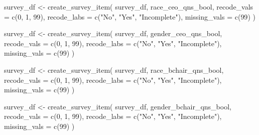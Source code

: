 \documentclass[
  letterpaper,
]{scrbook}
\newenvironment{Shaded}{\begin{snugshade}}{\end{snugshade}}
\newcommand{\AttributeTok}[1]{\textcolor[rgb]{0.40,0.45,0.13}{#1}}
\newcommand{\DecValTok}[1]{\textcolor[rgb]{0.68,0.00,0.00}{#1}}
\newcommand{\FunctionTok}[1]{\textcolor[rgb]{0.28,0.35,0.67}{#1}}
\newcommand{\NormalTok}[1]{\textcolor[rgb]{0.00,0.23,0.31}{#1}}
\newcommand{\OtherTok}[1]{\textcolor[rgb]{0.00,0.23,0.31}{#1}}
\newcommand{\StringTok}[1]{\textcolor[rgb]{0.13,0.47,0.30}{#1}}
\begin{document}
\begin{Shaded}
\begin{Highlighting}[]
\NormalTok{survey\_df }\OtherTok{\textless{}{-}} \FunctionTok{create\_survey\_item}\NormalTok{(}
\NormalTok{  survey\_df, }
\NormalTok{  race\_ceo\_qns\_bool, }
  \AttributeTok{recode\_vals =} \FunctionTok{c}\NormalTok{(}\DecValTok{0}\NormalTok{, }\DecValTok{1}\NormalTok{, }\DecValTok{99}\NormalTok{), }
  \AttributeTok{recode\_labs =} \FunctionTok{c}\NormalTok{(}\StringTok{"No"}\NormalTok{, }\StringTok{"Yes"}\NormalTok{, }\StringTok{"Incomplete"}\NormalTok{), }
  \AttributeTok{missing\_vals =} \FunctionTok{c}\NormalTok{(}\DecValTok{99}\NormalTok{)}
\NormalTok{)}

\NormalTok{survey\_df }\OtherTok{\textless{}{-}} \FunctionTok{create\_survey\_item}\NormalTok{(}
\NormalTok{  survey\_df, }
\NormalTok{  gender\_ceo\_qns\_bool, }
  \AttributeTok{recode\_vals =} \FunctionTok{c}\NormalTok{(}\DecValTok{0}\NormalTok{, }\DecValTok{1}\NormalTok{, }\DecValTok{99}\NormalTok{), }
  \AttributeTok{recode\_labs =} \FunctionTok{c}\NormalTok{(}\StringTok{"No"}\NormalTok{, }\StringTok{"Yes"}\NormalTok{, }\StringTok{"Incomplete"}\NormalTok{), }
  \AttributeTok{missing\_vals =} \FunctionTok{c}\NormalTok{(}\DecValTok{99}\NormalTok{)}
\NormalTok{)}

\NormalTok{survey\_df }\OtherTok{\textless{}{-}} \FunctionTok{create\_survey\_item}\NormalTok{(}
\NormalTok{  survey\_df, }
\NormalTok{  race\_bchair\_qns\_bool, }
  \AttributeTok{recode\_vals =} \FunctionTok{c}\NormalTok{(}\DecValTok{0}\NormalTok{, }\DecValTok{1}\NormalTok{, }\DecValTok{99}\NormalTok{), }
  \AttributeTok{recode\_labs =} \FunctionTok{c}\NormalTok{(}\StringTok{"No"}\NormalTok{, }\StringTok{"Yes"}\NormalTok{, }\StringTok{"Incomplete"}\NormalTok{), }
  \AttributeTok{missing\_vals =} \FunctionTok{c}\NormalTok{(}\DecValTok{99}\NormalTok{)}
\NormalTok{)}

\NormalTok{survey\_df }\OtherTok{\textless{}{-}} \FunctionTok{create\_survey\_item}\NormalTok{(}
\NormalTok{  survey\_df, }
\NormalTok{  gender\_bchair\_qns\_bool, }
  \AttributeTok{recode\_vals =} \FunctionTok{c}\NormalTok{(}\DecValTok{0}\NormalTok{, }\DecValTok{1}\NormalTok{, }\DecValTok{99}\NormalTok{), }
  \AttributeTok{recode\_labs =} \FunctionTok{c}\NormalTok{(}\StringTok{"No"}\NormalTok{, }\StringTok{"Yes"}\NormalTok{, }\StringTok{"Incomplete"}\NormalTok{), }
  \AttributeTok{missing\_vals =} \FunctionTok{c}\NormalTok{(}\DecValTok{99}\NormalTok{)}
\NormalTok{)}
\end{Highlighting}
\end{Shaded}
\end{document}
